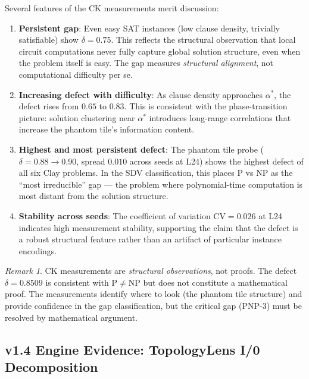 \documentclass[11pt]{article}
\theoremstyle{definition}
\theoremstyle{remark}
\newtheorem{remark}[theorem]{Remark}
\begin{document}
Several features of the CK measurements merit discussion:

\begin{enumerate}
  \item \textbf{Persistent gap}: Even easy SAT instances (low clause density,
    trivially satisfiable) show $\delta = 0.75$.  This reflects the structural
    observation that local circuit computations never fully capture global
    solution structure, even when the problem itself is easy.  The gap measures
    \emph{structural alignment}, not computational difficulty per se.

  \item \textbf{Increasing defect with difficulty}: As clause density approaches
    $\alpha^*$, the defect rises from $0.65$ to $0.83$.  This is consistent
    with the phase-transition picture: solution clustering near $\alpha^*$
    introduces long-range correlations that increase the phantom tile's
    information content.

  \item \textbf{Highest and most persistent defect}: The phantom tile probe
    ($\delta = 0.88 \to 0.90$, spread $0.010$ across seeds at L24) shows the
    highest defect of all six Clay problems.  In the SDV classification, this
    places P vs NP as the ``most irreducible'' gap --- the problem where
    polynomial-time computation is most distant from the solution structure.

  \item \textbf{Stability across seeds}: The coefficient of variation
    $\mathrm{CV} = 0.026$ at L24 indicates high measurement stability,
    supporting the claim that the defect is a robust structural feature
    rather than an artifact of particular instance encodings.
\end{enumerate}

\begin{remark}
CK measurements are \emph{structural observations}, not proofs.  The defect
$\delta = 0.8509$ is consistent with $\mathrm{P} \neq \mathrm{NP}$ but
does not constitute a mathematical proof.  The measurements identify where
to look (the phantom tile structure) and provide confidence in the gap
classification, but the critical gap (PNP-3) must be resolved by mathematical
argument.
\end{remark}

\subsection{v1.4 Engine Evidence: TopologyLens I/0 Decomposition}
\label{sec:topology-lens-pnp}
\end{document}
